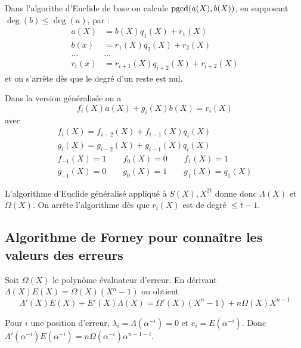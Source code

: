 	Dans l'algorithe d'Euclide de base on calcule $\operatorname{pgcd}(a(X),b(X))$, en supposant $\deg(b) \leq \deg(a)$, par :
	\begin{align*}
		a(X) & = b(X) q_1(X) + r_1(X) \\
		b(x) & = r_1(X) q_2(X) + r_2(X) \\
		\hdots & \hdots \\
		r_i(x) & = r_{i + 1}(X) q_{i + 2}(X) + r_{i + 2}(X)
	\end{align*}
	et on s'arrête dès que le degré d'un reste est nul.
	
	Dans la version généralisée on a
	$$f_i(X)a(X) + g_i(X)b(X) = r_i(X)$$
	avec
	$$\begin{array}{l}
		f_i(X) = f_{i - 2}(X) + f_{i - 1}(X) q_i(X) \\
		g_i(X) = g_{i - 2}(X) + g_{i - 1}(X) q_i(X) \\
		f_{-1}(X) = 1 \qquad f_0(X) = 0 \qquad f_1(X) = 1 \\
		g_{-1}(X) = 0 \qquad g_0(X) = 1 \qquad g_1(X) = q_1(X)
		\end{array}$$

	L'algorithme d'Euclide généralisé appliqué à $S(X), X^{2t}$ donne donc $\Lambda(X)$ et $\Omega(X)$.
	On arrête l'algorithme dès que $r_i(X)$ est de degré $\leq t - 1$.


\subsection{Algorithme de Forney pour connaître les valeurs des erreurs}

	Soit $\Omega(X)$ le polynôme évaluateur d'erreur.
	En dérivant $\Lambda(X)E(X) = \Omega(X)(X^n - 1)$ on obtient
	$$\Lambda'(X)E(X) + E'(X)\Lambda(X) = \Omega'(X)(X^n - 1) + n \Omega(X)X^{n - 1}$$

	Pour $i$ une position d'erreur, $\lambda_i = \Lambda(\alpha^{-i}) = 0$ et $e_i = E(\alpha^{-i})$.
	Donc $\Lambda'(\alpha^{-i}) E(\alpha^{-i}) = n \Omega(\alpha^{-i}) \alpha^{n - 1 - i}$.

